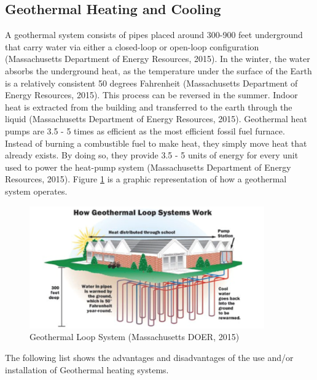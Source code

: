     \subsection{Geothermal Heating and Cooling}
    \par A geothermal system consists of pipes placed around 300-900 feet underground that carry water via either a closed-loop or open-loop configuration (Massachusetts Department of Energy Resources, 2015). In the winter, the water absorbs the underground heat, as the temperature under the surface of the Earth is a relatively consistent 50 degrees Fahrenheit (Massachusetts Department of Energy Resources, 2015). This process can be reversed in the summer. Indoor heat is extracted from the building and transferred to the earth through the liquid (Massachusetts Department of Energy Resources, 2015). Geothermal heat pumps are 3.5 - 5 times as efficient as the most efficient fossil fuel furnace. Instead of burning a combustible fuel to make heat, they simply move heat that already exists. By doing so, they provide 3.5 - 5 units of energy for every unit used to power the heat-pump system (Massachusetts Department of Energy Resources, 2015). Figure \ref{fig:geo} is a graphic representation of how a geothermal system operates.
    \begin{figure}[h]
      \centering
        \includegraphics[width=0.9\textwidth]{images/04-GeothermalLoopSystem}
      \caption{Geothermal Loop System (Massachusetts DOER, 2015)}
      \label{fig:geo}
    \end{figure}
    \par The following list shows the advantages and disadvantages of the use and/or installation of Geothermal heating systems.\\
    
